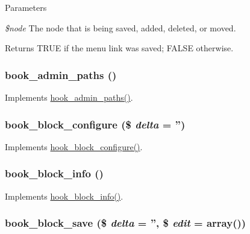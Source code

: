 \begin{DoxyParams}{Parameters}
\item[{\em \$node}]The node that is being saved, added, deleted, or moved.\end{DoxyParams}
\begin{DoxyReturn}{Returns}
TRUE if the menu link was saved; FALSE otherwise. 
\end{DoxyReturn}
\hypertarget{book_8module_ac366ddcef153a3d0ecf21423dbb3f0e7}{
\subsubsection[{book\_\-admin\_\-paths}]{\setlength{\rightskip}{0pt plus 5cm}book\_\-admin\_\-paths ()}}
\label{book_8module_ac366ddcef153a3d0ecf21423dbb3f0e7}
Implements \hyperlink{group__hooks_ga3fe6d93afc8bb04afbd9e3c326d1bdc1}{hook\_\-admin\_\-paths()}. \hypertarget{book_8module_a9a8e669743f131604cd0a606117b3e67}{
\subsubsection[{book\_\-block\_\-configure}]{\setlength{\rightskip}{0pt plus 5cm}book\_\-block\_\-configure (\$ {\em delta} = {\ttfamily ''})}}
\label{book_8module_a9a8e669743f131604cd0a606117b3e67}
Implements \hyperlink{group__hooks_gacc86fefd1e0299f387f79a37dd1a48b7}{hook\_\-block\_\-configure()}. \hypertarget{book_8module_a6fea491d1d87d4c6f8d6adfac7f64abd}{
\subsubsection[{book\_\-block\_\-info}]{\setlength{\rightskip}{0pt plus 5cm}book\_\-block\_\-info ()}}
\label{book_8module_a6fea491d1d87d4c6f8d6adfac7f64abd}
Implements \hyperlink{group__hooks_ga2bd926c3e90deeba0c3ba64fb3c64d73}{hook\_\-block\_\-info()}. \hypertarget{book_8module_a48769a6302a3aaa7d838c1c556827bf9}{
\subsubsection[{book\_\-block\_\-save}]{\setlength{\rightskip}{0pt plus 5cm}book\_\-block\_\-save (\$ {\em delta} = {\ttfamily ''}, \/  \$ {\em edit} = {\ttfamily array()})}}
